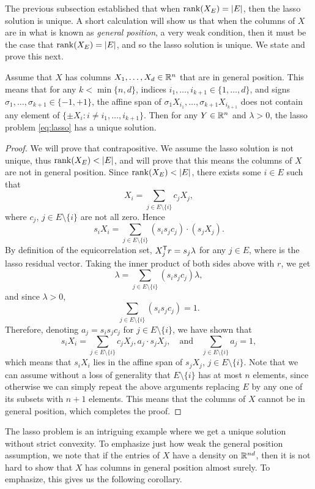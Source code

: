 \documentclass{article}
\begin{document}
The previous subsection established that when $\mathrm{rank}(X_E) = |E|$, then the lasso
solution is unique. A short calculation will show us that when the columns of 
$X$ are in what is known as \emph{general position}, a very weak condition, then
it must be the case that $\mathrm{rank}(X_E) = |E|$, and so the lasso solution is
unique. We state and prove this next.    

\begin{proposition}
Assume that $X$ has columns $X_1,\dots,X_d \in \mathbb{R}^n$ that are in general
position. This means that for any $k < \min\{n,d\}$, indices $i_1,\dots,i_{k+1} 
\in \{1,\dots,d\}$, and signs $\sigma_1,\dots,\sigma_{k+1} \in \{-1,+1\}$, the 
affine span of $\sigma_1 X_{i_1}, \dots,\sigma_{k+1} X_{i_{k+1}}$ does not
contain any element of $\{\pm X_i : i \not= i_1,\dots,i_{k+1}\}$. Then for any
$Y \in \mathbb{R}^n$ and $\lambda>0$, the lasso problem \eqref{eq:lasso} has a unique
solution. 
\end{proposition}

\begin{proof}
We will prove that contrapositive. We assume the lasso solution is not unique,
thus $\mathrm{rank}(X_E) < |E|$, and will prove that this means the columns of $X$ are
not in general position. Since $\mathrm{rank}(X_E) < |E|$, there exists some $i \in E$
such that 
\[
X_i = \sum_{j \in E\setminus\{i\}} c_j X_j,
\]
where $c_j$, $j \in E\setminus\{i\}$ are not all zero. Hence
\[
s_i X_i = \sum_{j \in E\setminus\{i\}} (s_i s_j c_j) \cdot (s_j X_j).
\]
By definition of the equicorrelation set, $X_j^{\mathsf{T}} r = s_j \lambda$ for any $j
\in E$, where  is the lasso residual vector. Taking the
inner  product of both sides above with $r$, we get 
\[
\lambda = \sum_{j \in E\setminus\{i\}} (s_i s_j c_j) \lambda,
\]
and since $\lambda>0$,
\[
\sum_{j \in E\setminus\{i\}} (s_i s_j c_j) = 1.
\]
Therefore, denoting $a_j = s_i s_j c_j$ for $j \in E\setminus\{i\}$, we have
shown that
\[
s_i X_i = \sum_{j \in E\setminus\{i\}} c_j X_j,
a_j \cdot s_j X_j, \quad \text{and} \quad 
\sum_{j \in E\setminus\{i\}} a_j = 1,
\]
which means that $s_iX_i$ lies in the affine span of $s_jX_j$, $j \in
E\setminus\{i\}$. Note that we can assume without a loss of generality that  
$E\setminus\{i\}$ has at most $n$ elements, since otherwise we can simply repeat
the above arguments replacing $E$ by any one of its subsets with $n+1$
elements. This means that the columns of $X$ cannot be in general position,
which completes the proof. 
\end{proof}

The lasso problem is an intriguing example where we get a unique solution
without strict convexity. To emphasize just how weak the general position
assumption, we note that if the entries of $X$ have a density on $\mathbb{R}^{nd}$, then
it is not hard to show that $X$ has columns in general position almost surely.
To emphasize, this gives us the following corollary.      
\end{document}

